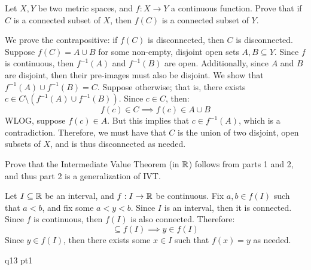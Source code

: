 \documentclass{article}
\begin{document}
\begin{qu}
    Let $ X, Y $ be two metric spaces, and $ f : X \rightarrow Y $ a continuous function.
    Prove that if $ C $ is a connected subset of $ X $,
    then $ f(C) $ is a connected subset of $ Y $.
\end{qu}

\begin{soln}
    We prove the contrapositive: if $ f(C) $ is disconnected, then $ C $ is disconnected. \vsp
    Suppose $ f(C) = A \cup B $ for some non-empty, disjoint open sets $ A, B \subseteq Y $.
    Since $ f $ is continuous, then $ f^{-1}(A) $ and $ f^{-1}(B) $ are open.
    Additionally, since $ A $ and $ B $ are disjoint, then their pre-images must also be disjoint.
    We show that $ f^{-1}(A) \cup f^{-1}(B) = C $. \vsp
    Suppose otherwise; that is, there exists $ c \in C \setminus (f^{-1}(A) \cup f^{-1}(B)) $.
    Since $ c \in C $, then:
    \begin{equation*}
        f(c) \in C \implies f(c) \in A \cup B
    \end{equation*}
    WLOG, suppose $ f(c) \in A $.
    But this implies that $ c \in f^{-1}(A) $, which is a contradiction.
    Therefore, we must have that $ C $ is the union of two disjoint, open subsets of $ X $,
    and is thus disconnected as needed.
\end{soln}

\begin{qu}
    Prove that the Intermediate Value Theorem (in $ \mathbb{R} $) follows from parts 1 and 2, and thus
    part 2 is a generalization of IVT.
\end{qu}

\begin{soln}
    Let $ I \subseteq \mathbb{R} $ be an interval, and $ f : I \rightarrow \mathbb{R} $ be continuous.
    Fix $ a, b \in f(I) $ such that $ a < b $, and fix some $ a < y < b $. \vsp
    Since $ I $ is an interval, then it is connected.
    Since $ f $ is continuous, then $ f(I) $ is also connected. Therefore:
    \begin{equation*}
        [a, b] \subseteq f(I) \implies y \in f(I)
    \end{equation*}
    Since $ y \in f(I) $, then there exists some $ x \in I $ such that $ f(x) = y $ as needed.
\end{soln}

\newpage
{}

\begin{qu}
    q13 pt1
\end{qu}
\end{document}
